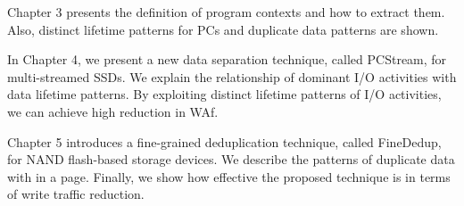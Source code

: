 Chapter 3 presents the definition of program contexts and how to extract them.
Also, distinct lifetime patterns for PCs and duplicate data patterns are shown.

In Chapter 4, we present a new data separation technique, called PCStream, 
for multi-streamed SSDs. We explain the relationship of dominant I/O activities
with data lifetime patterns. By exploiting distinct lifetime patterns of I/O activities,
we can achieve high reduction in WAf.

Chapter 5 introduces a fine-grained deduplication technique, called FineDedup, for NAND
flash-based storage devices. We describe the patterns of duplicate data with in a page.
Finally, we show how effective the proposed technique is in terms of write traffic reduction.

